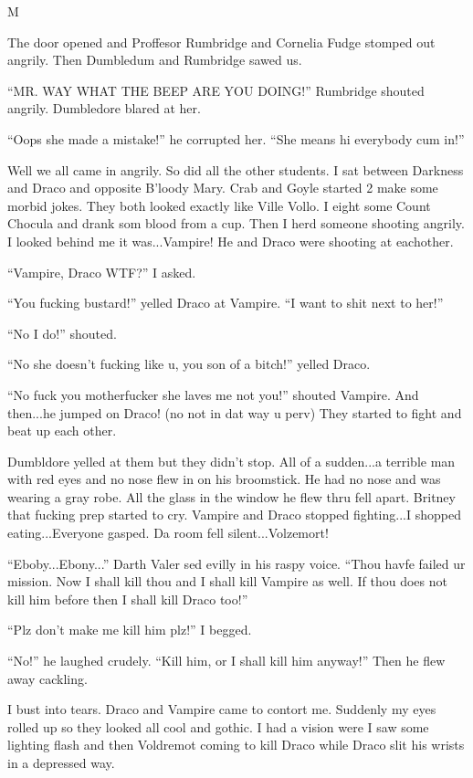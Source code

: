 M\documentclass{article}
\begin{document}
\textbreak
\linenumbers\resetlinenumber

The door opened and Proffesor Rumbridge and Cornelia Fudge stomped out angrily. Then Dumbledum and Rumbridge sawed us.

“MR. WAY WHAT THE BEEP ARE YOU DOING!” Rumbridge shouted angrily. Dumbledore blared at her.

“Oops she made a mistake!” he corrupted her. “She means hi everybody cum in!”

Well we all came in angrily. So did all the other students. I sat between Darkness and Draco and opposite B’loody Mary. Crab and Goyle started 2 make some morbid jokes. They both looked exactly like Ville Vollo. I eight some Count Chocula and drank som blood from a cup. Then I herd someone shooting angrily. I looked behind me it was...Vampire! He and Draco were shooting at eachother.

“Vampire, Draco WTF?” I asked.

“You fucking bustard!” yelled Draco at Vampire. “I want to shit next to her!”

“No I do!” shouted.

“No she doesn’t fucking like u, you son of a bitch!” yelled Draco.

“No fuck you motherfucker she laves me not you!” shouted Vampire. And then...he jumped on Draco! (no not in dat way u perv) They started to fight and beat up each other.

Dumbldore yelled at them but they didn’t stop. All of a sudden...a terrible man with red eyes and no nose flew in on his broomstick. He had no nose and was wearing a gray robe. All the glass in the window he flew thru fell apart. Britney that fucking prep started to cry. Vampire and Draco stopped fighting...I shopped eating...Everyone gasped. Da room fell silent...Volzemort!

“Eboby...Ebony...” Darth Valer sed evilly in his raspy voice. “Thou havfe failed ur mission. Now I shall kill thou and I shall kill Vampire as well. If thou does not kill him before then I shall kill Draco too!”

“Plz don’t make me kill him plz!” I begged.

“No!” he laughed crudely. “Kill him, or I shall kill him anyway!” Then he flew away cackling.

I bust into tears. Draco and Vampire came to contort me. Suddenly my eyes rolled up so they looked all cool and gothic. I had a vision were I saw some lighting flash and then Voldremot coming to kill Draco while Draco slit his wrists in a depressed way.
\end{document}
